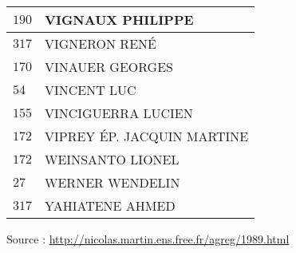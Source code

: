 \begin{xltabular}{\linewidth}{|l|X|}
    \hline
    $190$ & VIGNAUX PHILIPPE \\
    \hline
    $317$ & VIGNERON RENÉ \\
    \hline
    $170$ & VINAUER GEORGES \\
    \hline
    $54$ & VINCENT LUC \\
    \hline
    $155$ & VINCIGUERRA LUCIEN \\
    \hline
    $172$ & VIPREY ÉP. JACQUIN MARTINE \\
    \hline
    $172$ & WEINSANTO LIONEL \\
    \hline
    $27$ & WERNER WENDELIN \\
    \hline
    $317$ & YAHIATENE AHMED \\
    \hline
  \end{xltabular}

  \begin{flushright}
    {\tiny Source : \url{http://nicolas.martin.ens.free.fr/agreg/1989.html}}
  \end{flushright}

